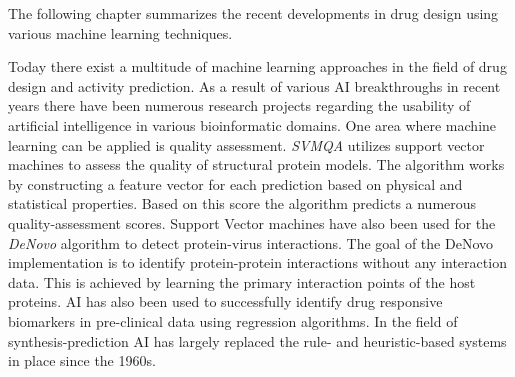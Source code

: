 The following chapter summarizes the recent developments in drug design using various machine 
learning techniques. 

Today there exist a multitude of machine learning approaches in the field of drug design and activity prediction.
As a result of various AI breakthroughs in recent years there have been numerous research projects regarding the usability of artificial intelligence
in various bioinformatic domains.
One area where machine learning can be applied is quality assessment.
\textit{SVMQA} utilizes support vector machines to assess the quality of structural protein models.
The algorithm works by constructing a feature vector for each prediction based on physical and statistical properties.
Based on this score the algorithm predicts a numerous quality-assessment scores\cite{Manavalan2017}.
Support Vector machines have also been used for the \textit{DeNovo} algorithm to detect protein-virus interactions.
The goal of the DeNovo implementation is to identify protein-protein interactions without any interaction data.
This is achieved by learning the primary interaction points of the host proteins\cite{Eid2016}.
AI has also been used to successfully identify drug responsive biomarkers in pre-clinical data using regression algorithms\cite{Li2015}.
In the field of synthesis-prediction AI has largely replaced the rule- and heuristic-based systems in place since the 1960s\cite{Johansson2019}.

